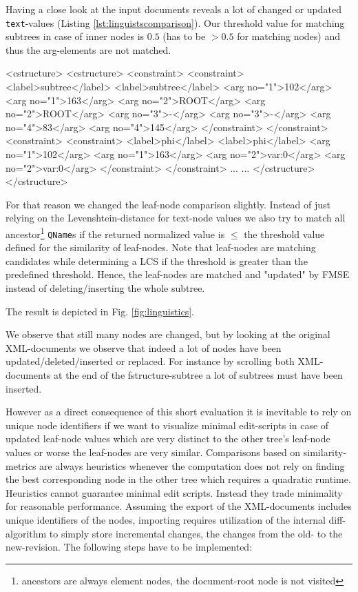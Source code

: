 Having a close look at the input documents reveals a lot of changed or updated \texttt{text}-values (Listing \ref{lst:linguistscomparison}). Our threshold value for matching subtrees in case of inner nodes is $0.5$ (has to be $> 0.5$ for matching nodes) and thus the arg-elements are not matched.

\begin{code}[caption={CStructure comparison.},label={lst:linguistscomparison}]
<cstructure>                   <cstructure>
  <constraint>                   <constraint>
    <label>subtree</label>         <label>subtree</label>
    <arg no="1">102</arg>          <arg no="1">163</arg>
    <arg no="2">ROOT</arg>         <arg no="2">ROOT</arg>   
    <arg no="3">-</arg>            <arg no="3">-</arg>
    <arg no="4">83</arg>           <arg no="4">145</arg>
  </constraint>                  </constraint>
  <constraint>                   <constraint>
    <label>phi</label>             <label>phi</label>
    <arg no="1">102</arg>          <arg no="1">163</arg>
    <arg no="2">var:0</arg>        <arg no="2">var:0</arg>
  </constraint>                  </constraint>
  ...                            ...
</cstructure>                  </cstructure>
\end{code}

For that reason we changed the leaf-node comparison slightly. Instead of just relying on the Levenshtein-distance for text-node values we also try to match all ancestor\footnote{ancestors are always element nodes, the document-root node is not visited} \texttt{QName}s if the returned normalized value is $\leq$ the threshold value defined for the similarity of leaf-nodes. Note that leaf-nodes are matching candidates while determining a LCS if the threshold is greater than the predefined threshold. Hence, the leaf-nodes are matched and "updated" by FMSE instead of deleting/inserting the whole subtree.

The result is depicted in Fig. \ref{fig:linguistics}.

We observe that still many nodes are changed, but by looking at the original XML-documents we observe that indeed a lot of nodes have been updated/deleted/inserted or replaced. For instance by scrolling both XML-documents at the end of the fstructure-subtree a lot of subtrees must have been inserted.

However as a direct consequence of this short evaluation it is inevitable to rely on unique node identifiers if we want to visualize minimal edit-scripts in case of updated leaf-node values which are very distinct to the other tree's leaf-node values or worse the leaf-nodes are very similar. Comparisons based on similarity-metrics are always heuristics whenever the computation does not rely on finding the best corresponding node in the other tree which requires a quadratic runtime. Heuristics cannot guarantee minimal edit scripts. Instead they trade minimality for reasonable performance. Assuming the export of the XML-documents includes unique identifiers of the nodes, importing requires utilization of the internal diff-algorithm to simply store incremental changes, the changes from the old- to the new-revision. The following steps have to be implemented:

